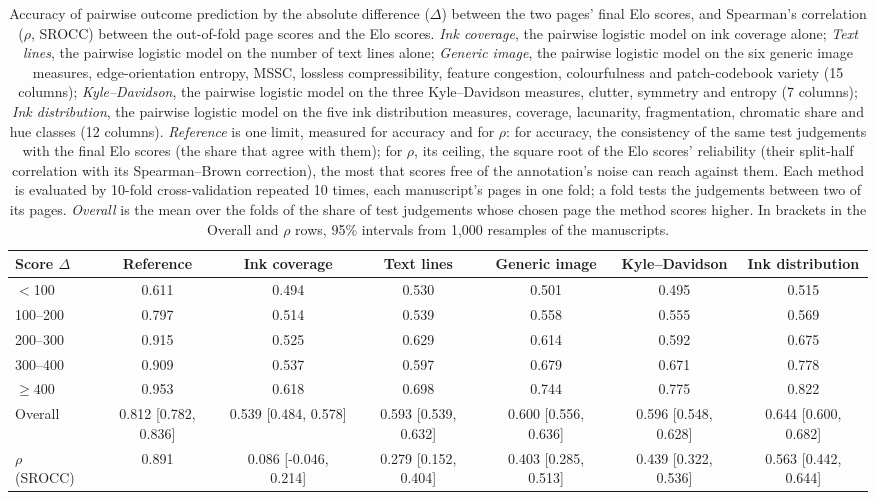 \begin{table}[htbp]
  \centering
  \caption{Accuracy of pairwise outcome prediction by the absolute difference ($\Delta$) between the two pages' final Elo scores, and Spearman's correlation ($\rho$, SROCC) between the out-of-fold page scores and the Elo scores. \emph{Ink coverage}, the pairwise logistic model on ink coverage alone; \emph{Text lines}, the pairwise logistic model on the number of text lines alone; \emph{Generic image}, the pairwise logistic model on the six generic image measures, edge-orientation entropy, MSSC, lossless compressibility, feature congestion, colourfulness and patch-codebook variety (15 columns); \emph{Kyle--Davidson}, the pairwise logistic model on the three Kyle--Davidson measures, clutter, symmetry and entropy (7 columns); \emph{Ink distribution}, the pairwise logistic model on the five ink distribution measures, coverage, lacunarity, fragmentation, chromatic share and hue classes (12 columns). \emph{Reference} is one limit, measured for accuracy and for $\rho$: for accuracy, the consistency of the same test judgements with the final Elo scores (the share that agree with them); for $\rho$, its ceiling, the square root of the Elo scores' reliability (their split-half correlation with its Spearman--Brown correction), the most that scores free of the annotation's noise can reach against them. Each method is evaluated by 10-fold cross-validation repeated 10 times, each manuscript's pages in one fold; a fold tests the judgements between two of its pages. \emph{Overall} is the mean over the folds of the share of test judgements whose chosen page the method scores higher. In brackets in the Overall and $\rho$ rows, 95\% intervals from 1,000 resamples of the manuscripts.}
  \label{tab:baselines_by_elo_gap}
  \begin{tabular}{lcccccc}
    \toprule
    Score $\Delta$ & Reference & Ink coverage & Text lines & Generic image & Kyle--Davidson & Ink distribution \\
    \midrule
    $<$100 & 0.611 & 0.494 & 0.530 & 0.501 & 0.495 & 0.515 \\
    100--200 & 0.797 & 0.514 & 0.539 & 0.558 & 0.555 & 0.569 \\
    200--300 & 0.915 & 0.525 & 0.629 & 0.614 & 0.592 & 0.675 \\
    300--400 & 0.909 & 0.537 & 0.597 & 0.679 & 0.671 & 0.778 \\
    $\geq 400$ & 0.953 & 0.618 & 0.698 & 0.744 & 0.775 & 0.822 \\
    \midrule
    Overall & 0.812 [0.782, 0.836] & 0.539 [0.484, 0.578] & 0.593 [0.539, 0.632] & 0.600 [0.556, 0.636] & 0.596 [0.548, 0.628] & 0.644 [0.600, 0.682] \\
    \midrule
    $\rho$ (SROCC) & 0.891 & 0.086 [-0.046, 0.214] & 0.279 [0.152, 0.404] & 0.403 [0.285, 0.513] & 0.439 [0.322, 0.536] & 0.563 [0.442, 0.644] \\
    \bottomrule
  \end{tabular}
\end{table}
